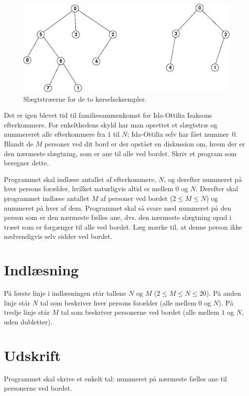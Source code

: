 \begin{figure}[h!]
  \centering
  \includegraphics[width=16cm]{slakttraffen.png}
  \caption{Slægtstræerne for de to kørselseksempler.}
\end{figure}

Det er igen blevet tid til familiesammenkomst for Ida-Ottilia Isaksons efterkommere.
For enkelthedens skyld har man oprettet et slægtstræ og nummereret alle efterkommere fra $1$ til $N$; Ida-Ottilia selv har fået nummer~$0$.
Blandt de $M$ personer ved dit bord er der opstået en diskussion om, hvem der er den nærmeste slægtning, som er ane til alle ved bordet.
Skriv et program som beregner dette.

Programmet skal indlæse antallet af efterkommere, $N$, og derefter nummeret på hver persons forælder, hvilket naturligvis altid er mellem $0$ og $N$.
Derefter skal programmet indlæse antallet $M$ af personer ved bordet ($2 \le M \le N$) og nummeret på hver af dem.
Programmet skal så svare med nummeret på den person som er den nærmeste fælles ane, dvs. den nærmeste slægtning opad i træet som er forgænger til alle ved bordet.
Læg mærke til, at denne person ikke nødvendigvis selv sidder ved bordet.

\section*{Indlæsning}
På første linje i indlæsningen står tallene $N$ og $M$ ($2 \le M \le N \le 20$).
På anden linje står $N$ tal som beskriver hver persons forælder (alle mellem $0$ og $N$).
På tredje linje står $M$ tal som beskriver personerne ved bordet (alle mellem $1$ og $N$, uden dubletter).

\section*{Udskrift}
Programmet skal skrive et enkelt tal: nummeret på nærmeste fælles ane til personerne ved bordet.

